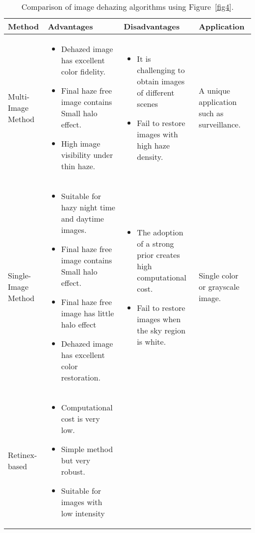 \documentclass[doctor,english,listoffigures,listoftables]{thesis-uestc}
\begin{document}
\begin{table}[!htb]
    \centering
    \caption{Comparison of image dehazing algorithms using Figure~\ref{fig4}.}
    \begin{tabular}{ | m{2.5cm} | m{4.5cm}| m{4.5cm} | m{2.8cm} | } 
        \hline
        \textbf{Method} & \textbf{Advantages} & \textbf{Disadvantages} & \textbf{Application} \\
        \hline
        Multi-Image Method & 
        \begin{itemize} 
            \item Dehazed image has excellent color fidelity. 
            \item Final haze free image contains Small halo effect.
            \item High image visibility under thin haze. 
        \end{itemize} & 
        \begin{itemize} 
            \item It is challenging to obtain images of different scenes
            \item Fail to restore images with high haze density.
        \end{itemize} & A unique application such as surveillance.
        \\
        \hline
        Single-Image Method & 
        \begin{itemize} 
            \item Suitable for hazy night time and daytime images. 
            \item Final haze free image contains Small halo effect.
            \item Final haze free image has little halo effect
            \item Dehazed image has excellent color restoration. 
        \end{itemize} & 
        \begin{itemize} 
            \item The adoption of a strong prior creates high computational cost.
            \item Fail to restore images when the sky region is white.
        \end{itemize} & Single color or grayscale image.
        \\
        \hline
        Retinex-based & 
        \begin{itemize} 
            \item Computational cost is very low. 
            \item Simple method but very robust.
            \item Suitable for images with low intensity
        \end{itemize} & 


\end{tabular}
\end{table}
\end{document}

